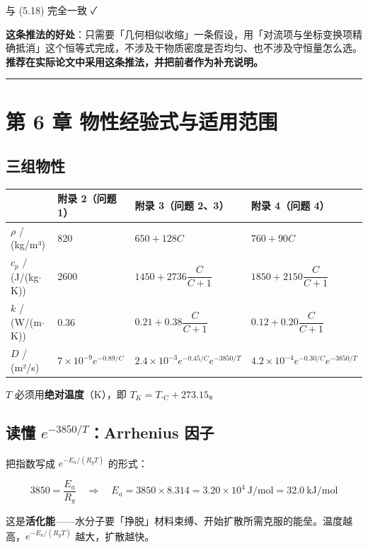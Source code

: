 与 (5.18) 完全一致 ✓


\textbf{这条推法的好处}：只需要「几何相似收缩」一条假设，用「对流项与坐标变换项精确抵消」这个恒等式完成，不涉及干物质密度是否均匀、也不涉及守恒量怎么选。\textbf{推荐在实际论文中采用这条推法，并把前者作为补充说明。}


\vspace{1mm}\hrule\vspace{1mm}


\section{第 6 章 物性经验式与适用范围}


\subsection{三组物性}


\begin{center}
\small
\begin{tabular}{llll}
\toprule
 & 附录 2（问题 1） & 附录 3（问题 2、3） & 附录 4（问题 4） \\
\midrule
$\rho$ / (kg/m³) & 820 & $650+128C$ & $760+90C$ \\
$c_p$ / (J/(kg$\cdot$K)) & 2600 & $1450+2736\dfrac{C}{C+1}$ & $1850+2150\dfrac{C}{C+1}$ \\
$k$ / (W/(m$\cdot$K)) & 0.36 & $0.21+0.38\dfrac{C}{C+1}$ & $0.12+0.20\dfrac{C}{C+1}$ \\
$D$ / (m²/s) & $7\times10^{-9}e^{-0.89/C}$ & $2.4\times10^{-3}e^{-0.45/C}e^{-3850/T}$ & $4.2\times10^{-4}e^{-0.30/C}e^{-3850/T}$ \\
\bottomrule
\end{tabular}
\end{center}


$T$ 必须用\textbf{绝对温度}（K），即 $T_K=T_{\mathrm{^\circ C}}+273.15$。


\subsection{读懂 $e^{-3850/T}$：Arrhenius 因子}


把指数写成 $e^{-E_a/(R_gT)}$ 的形式：


\begin{equation*}
3850=\frac{E_a}{R_g}\quad\Longrightarrow\quad E_a=3850\times8.314=3.20\times10^4\ \mathrm{J/mol}=32.0\ \mathrm{kJ/mol}
\end{equation*}


这是\textbf{活化能}——水分子要「挣脱」材料束缚、开始扩散所需克服的能垒。温度越高，$e^{-E_a/(R_gT)}$ 越大，扩散越快。


